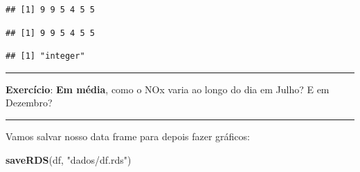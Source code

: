 \documentclass[]{book}
\newenvironment{Shaded}{\begin{snugshade}}{\end{snugshade}}
\newcommand{\KeywordTok}[1]{\textcolor[rgb]{0.13,0.29,0.53}{\textbf{#1}}}
\newcommand{\DecValTok}[1]{\textcolor[rgb]{0.00,0.00,0.81}{#1}}
\newcommand{\StringTok}[1]{\textcolor[rgb]{0.31,0.60,0.02}{#1}}
\newcommand{\OperatorTok}[1]{\textcolor[rgb]{0.81,0.36,0.00}{\textbf{#1}}}
\newcommand{\NormalTok}[1]{#1}
\theoremstyle{definition}
\theoremstyle{definition}
\theoremstyle{definition}
\theoremstyle{remark}
\begin{document}
\begin{Shaded}
\end{Shaded}

\begin{verbatim}
## [1] 9 9 5 4 5 5
\end{verbatim}

\begin{Shaded}
\end{Shaded}

\begin{verbatim}
## [1] 9 9 5 4 5 5
\end{verbatim}

\begin{Shaded}
\end{Shaded}

\begin{verbatim}
## [1] "integer"
\end{verbatim}

\begin{center}\rule{0.5\linewidth}{\linethickness}\end{center}

{\textbf{Exercício}: \textbf{Em média}, como o NOx varia ao longo do dia
em Julho? E em Dezembro?}

\begin{center}\rule{0.5\linewidth}{\linethickness}\end{center}

Vamos salvar nosso data frame para depois fazer gráficos:

\begin{Shaded}
\begin{Highlighting}[]
\KeywordTok{saveRDS}\NormalTok{(df, }\StringTok{"dados/df.rds"}\NormalTok{)}
\end{Highlighting}
\end{Shaded}
\end{document}
